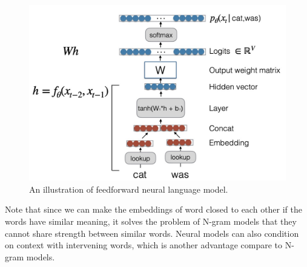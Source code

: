 \documentclass[a4paper]{article}
\begin{document}
\begin{figure}
  \centering
  \includegraphics[width=0.6\linewidth]{figs/forward-nn-lm.jpg}
  \caption{An illustration of feedforward neural language 
  model.}
  \label{feedforward-nn-lm}
\end{figure}

Note that since we can make the embeddings of word closed to 
each other if the words have similar meaning, it solves the 
problem of N-gram models that they cannot share strength 
between similar words. Neural models can also condition 
on context with intervening words, which is another advantage
compare to N-gram models.
\end{document}
